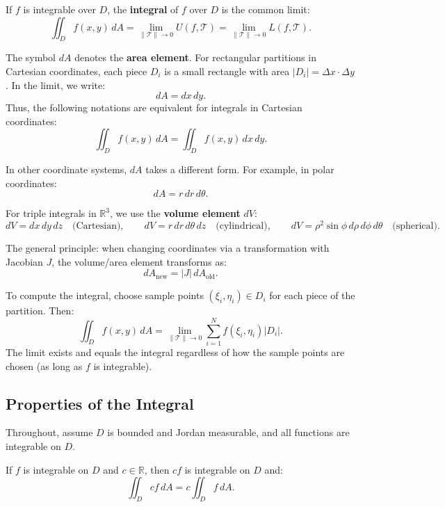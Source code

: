 \documentclass[11pt]{report}
\newcommand{\R}{\mathbb{R}}
\begin{document}
\begin{definition}
If $f$ is integrable over $D$, the \textbf{integral} of $f$ over $D$ is the common limit:
\[
\iint_D f(x, y) \, dA = \lim_{\|\mathcal{T}\| \to 0} U(f, \mathcal{T}) = \lim_{\|\mathcal{T}\| \to 0} L(f, \mathcal{T}).
\]
\end{definition}

\begin{remark}
The symbol $dA$ denotes the \textbf{area element}. For rectangular partitions in Cartesian coordinates, each piece $D_i$ is a small rectangle with area $|D_i| = \Delta x \cdot \Delta y$. In the limit, we write:
\[
dA = dx \, dy.
\]
Thus, the following notations are equivalent for integrals in Cartesian coordinates:
\[
\iint_D f(x, y) \, dA = \iint_D f(x, y) \, dx \, dy.
\]

In other coordinate systems, $dA$ takes a different form. For example, in polar coordinates:
\[
dA = r \, dr \, d\theta.
\]

For triple integrals in $\R^3$, we use the \textbf{volume element} $dV$:
\[
dV = dx \, dy \, dz \quad \text{(Cartesian)}, \qquad dV = r \, dr \, d\theta \, dz \quad \text{(cylindrical)}, \qquad dV = \rho^2 \sin\phi \, d\rho \, d\phi \, d\theta \quad \text{(spherical)}.
\]

The general principle: when changing coordinates via a transformation with Jacobian $J$, the volume/area element transforms as:
\[
dA_{\text{new}} = |J| \, dA_{\text{old}}.
\]
\end{remark}

\begin{remark}
To compute the integral, choose sample points $(\xi_i, \eta_i) \in D_i$ for each piece of the partition. Then:
\[
\iint_D f(x, y) \, dA = \lim_{\|\mathcal{T}\| \to 0} \sum_{i=1}^{N} f(\xi_i, \eta_i) |D_i|.
\]
The limit exists and equals the integral regardless of how the sample points are chosen (as long as $f$ is integrable).
\end{remark}

\subsection{Properties of the Integral}

Throughout, assume $D$ is bounded and Jordan measurable, and all functions are integrable on $D$.

\begin{theorem}
If $f$ is integrable on $D$ and $c \in \R$, then $cf$ is integrable on $D$ and:
\[
\iint_D cf \, dA = c \iint_D f \, dA.
\]
\end{theorem}
\end{document}
